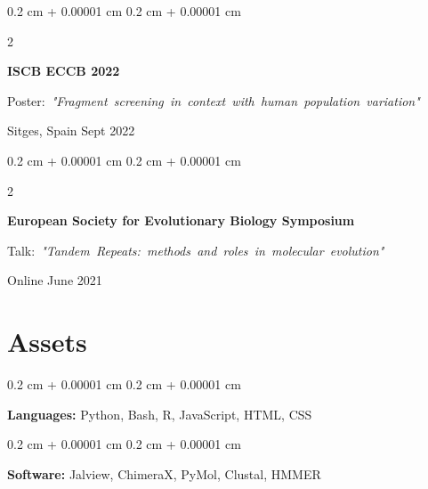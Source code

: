 \documentclass[10pt, letterpaper]{article}
\newenvironment{onecolentry}{
    \begin{adjustwidth}{
        0.2 cm + 0.00001 cm
    }{
        0.2 cm + 0.00001 cm
    }
}{
    \end{adjustwidth}
} %
\newenvironment{twocolentry}[2][]{
    \onecolentry
    \def\secondColumn{#2}
    \setcolumnwidth{\fill, 4.5 cm}
    \begin{paracol}{2}
}{
    \switchcolumn \raggedleft \secondColumn
    \end{paracol}
    \endonecolentry
} %
\begin{document}
        \vspace{0.2 cm}

        \begin{samepage}
            \begin{twocolentry}{
                Sept 2022
            }
                \textbf{ISCB ECCB 2022}

                \vspace{0.10 cm}

                \mbox{Poster: \textit{"Fragment screening in context with human population variation"}}
                \vspace{0.10 cm}

        Sitges, Spain    \end{twocolentry}
        \end{samepage}

        \vspace{0.2 cm}

        \begin{samepage}
            \begin{twocolentry}{
                June 2021
            }
                \textbf{European Society for Evolutionary Biology Symposium}

                \vspace{0.10 cm}

                \mbox{Talk: \textit{"Tandem Repeats: methods and roles in molecular evolution"}}
                \vspace{0.10 cm}

        Online    \end{twocolentry}
        \end{samepage}


    
    \section{Assets}



        
        \begin{onecolentry}
            \textbf{Languages:} Python, Bash, R, JavaScript, HTML, CSS
        \end{onecolentry}

        \vspace{0.2 cm}

        \begin{onecolentry}
            \textbf{Software:} Jalview, ChimeraX, PyMol, Clustal, HMMER
        \end{onecolentry}
\end{document}
